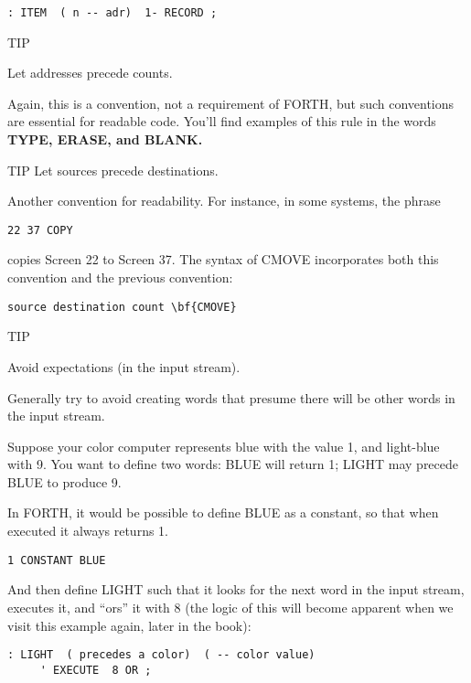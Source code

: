 \begin{verbatim}
: ITEM  ( n -- adr)  1- RECORD ;
\end{verbatim}

TIP

Let addresses precede counts.

Again, this is a convention, not a requirement of FORTH, but such conventions
are essential for readable code. You'll find examples of this rule
in the words \bf{TYPE}, \bf{ERASE}, and \bf{BLANK}.

TIP
Let sources precede destinations.

Another convention for readability. For instance, in some systems, the
phrase

\begin{verbatim}
22 37 COPY
\end{verbatim}

copies Screen 22 to Screen 37. The syntax of CMOVE incorporates both
this convention and the previous convention:

\begin{verbatim}
source destination count \bf{CMOVE}
\end{verbatim}

TIP

Avoid expectations (in the input stream).

Generally try to avoid creating words that presume there will be other
words in the input stream.

Suppose your color computer represents blue with the value 1, and
light-blue with 9. You want to define two words: BLUE will return 1;
LIGHT may precede BLUE to produce 9.

In FORTH, it would be possible to define BLUE as a constant, so
that when executed it always returns 1.

\begin{verbatim}
1 CONSTANT BLUE
\end{verbatim}

And then define LIGHT such that it looks for the next word in the input
stream, executes it, and ``ors'' it with 8 (the logic of this will become
apparent when we visit this example again, later in the book):

\begin{verbatim}
: LIGHT  ( precedes a color)  ( -- color value)
     ' EXECUTE  8 OR ;
\end{verbatim}

